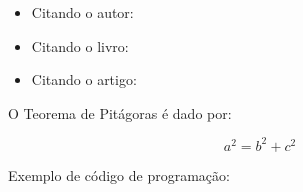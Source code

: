 \begin{itemize}%
  \item Citando o autor: 
  \item Citando o livro: \cite{Goodfellow2016}
  \item Citando o artigo: \cite{FernandezCaballero2016}
\end{itemize}
    

O Teorema de Pitágoras é dado por:

\begin{equation}
	a^{2}= b^{2}+c^{2}
\end{equation}
  
Exemplo de código de programação:
  
